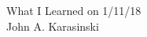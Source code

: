 \documentclass[12pt]{report}
\begin{document}
\noindent\huge{What I Learned on 1/11/18}\\
\large{John A. Karasinski}
\end{document}
